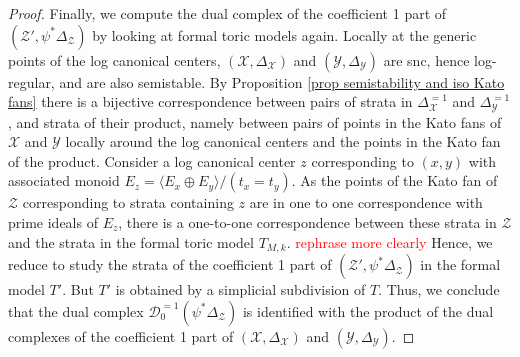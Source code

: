 \documentclass{amsart}%
\numberwithin{equation}{subsection}
\theoremstyle{plain2}
\theoremstyle{definition2}
\theoremstyle{stepstyle}
\theoremstyle{point}
\theoremstyle{subpoint}
\newcommand{\D}{{\mathcal D}}
\newcommand{\cX}{\ensuremath{\mathscr{X}}}
\newcommand{\cY}{\ensuremath{\mathscr{Y}}}
\newcommand{\cZ}{\ensuremath{\mathscr{Z}}}
\renewcommand{\cY}{\ensuremath{\mathscr{Y}}}
\begin{document}
\begin{proof}
Finally, we compute the dual complex of the coefficient 1 part of $(\cZ', \psi^*\Delta_\cZ)$ by looking at formal toric models again. Locally at the generic points of the log canonical centers, $(\cX,\Delta_{\cX})$ and $(\cY,\Delta_{\cY})$ are snc, hence log-regular, and are also semistable. By Proposition \ref{prop semistability and iso Kato fans} there is a bijective correspondence between pairs of strata in $\Delta_{\cX}^{=1}$ and $\Delta_{\cY}^{=1}$, and strata of their product, namely between pairs of points in the Kato fans of $\cX$ and $\cY$ locally around the log canonical centers and the points in the Kato fan of the product. Consider a log canonical center $z$ corresponding to $(x,y)$ with associated monoid $E_z = \langle E_x \oplus E_y \rangle /(t_x=t_y)$. As the points of the Kato fan of $\cZ$ corresponding to strata containing $z$ are in one to one correspondence with prime ideals of $E_z$, there is a one-to-one correspondence between these strata in $\cZ$ and the strata in the formal toric model $T_{M,k}$. \textcolor{red}{rephrase more clearly} Hence, we reduce to study the strata of the coefficient 1 part of $(\cZ',\psi^*\Delta_\cZ )$ in the formal model $T'$. But $T'$ is obtained by a simplicial subdivision of $T$. Thus, we conclude that the dual complex $\D^{=1}_0(\psi^*\Delta_\cZ)$ is identified with the product of the dual complexes of the coefficient 1 part of $(\cX,\Delta_{\cX})$ and $(\cY,\Delta_{\cY})$.
\end{proof}
\end{document}
